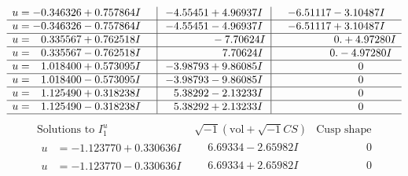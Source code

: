 \documentclass[1p]{elsarticle_modified}
\theoremstyle{definition}
\newcommand{\I}{\sqrt{-1}}
\begin{document}
$$\begin{array}{c|c|c}
\begin{aligned}
u &= -0.346326 + 0.757864 I\end{aligned}
 & -4.55451 + 4.96937 I & -6.51117 - 3.10487 I \\ \hline\begin{aligned}
u &= -0.346326 - 0.757864 I\end{aligned}
 & -4.55451 - 4.96937 I & -6.51117 + 3.10487 I \\ \hline\begin{aligned}
u &= \phantom{-}0.335567 + 0.762518 I\end{aligned}
 & \phantom{-0.000000 } -7.70624 I & \phantom{-0.000000 -}0. + 4.97280 I \\ \hline\begin{aligned}
u &= \phantom{-}0.335567 - 0.762518 I\end{aligned}
 & \phantom{-0.000000 -}7.70624 I & \phantom{-0.000000 } 0. - 4.97280 I \\ \hline\begin{aligned}
u &= \phantom{-}1.018400 + 0.573095 I\end{aligned}
 & -3.98793 + 9.86085 I & \phantom{-0.000000 } 0 \\ \hline\begin{aligned}
u &= \phantom{-}1.018400 - 0.573095 I\end{aligned}
 & -3.98793 - 9.86085 I & \phantom{-0.000000 } 0 \\ \hline\begin{aligned}
u &= \phantom{-}1.125490 + 0.318238 I\end{aligned}
 & \phantom{-}5.38292 - 2.13233 I & \phantom{-0.000000 } 0 \\ \hline\begin{aligned}
u &= \phantom{-}1.125490 - 0.318238 I\end{aligned}
 & \phantom{-}5.38292 + 2.13233 I & \phantom{-0.000000 } 0\\
 \hline 
 \end{array}$$\newpage$$\begin{array}{c|c|c}  
\text{Solutions to }I^u_{1}& \I (\text{vol} + \sqrt{-1}CS) & \text{Cusp shape}\\
 \hline 
\begin{aligned}
u &= -1.123770 + 0.330636 I\end{aligned}
 & \phantom{-}6.69334 - 2.65982 I & \phantom{-0.000000 } 0 \\ \hline\begin{aligned}
u &= -1.123770 - 0.330636 I\end{aligned}
 & \phantom{-}6.69334 + 2.65982 I & \phantom{-0.000000 } 0 \\ \hline\begin{aligned}

\end{aligned}
\end{array}$$
\end{document}
